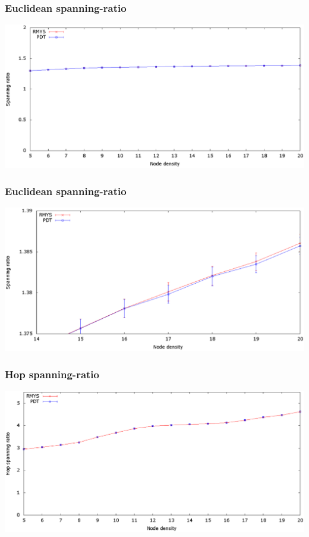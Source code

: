 \documentclass[compress]{beamer}
\begin{document}
\begin{frame} 
\frametitle{Euclidean spanning-ratio}
\center	\includegraphics[width=1.0\linewidth]{RMYS_PDT_SpanningRatio.eps}
\end{frame}

\begin{frame} 
\frametitle{Euclidean spanning-ratio}
\center	\includegraphics[width=1.0\linewidth]{RMYS_PDT_SpanningRatio-hd.eps}
\end{frame}

\begin{frame} 
\frametitle{Hop spanning-ratio}
\center	\includegraphics[width=1.0\linewidth]{RMYS_PDT_HopSpanningRatio.eps}
\end{frame}
\end{document}
